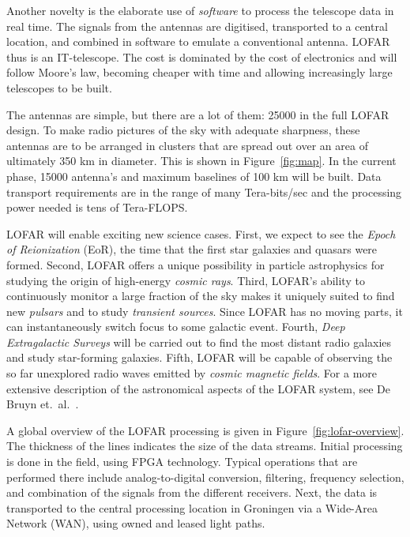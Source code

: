 \documentclass{article}
\begin{document}
Another novelty is the elaborate
use of \emph{software\/} to process the telescope data in real time.
The signals from the
antennas are digitised, transported to a central location,
and combined in software to emulate a conventional antenna. 
LOFAR thus is an IT-telescope. 
The cost
is dominated by the cost of electronics and will follow Moore's law,
becoming cheaper with time and allowing increasingly large telescopes
to be built. 

The antennas are simple, but there are a lot of them: 25000 in the full LOFAR
design. To make radio pictures of the sky with adequate sharpness,
these antennas are to be arranged in clusters that are spread out over
an area of ultimately 350 km in diameter. This is shown in Figure~\ref{fig:map}.
In the current phase, 15000 
antenna's and maximum baselines of 100 km will
be built. Data transport requirements are in the range of many
Tera-bits/sec and the processing power needed is tens of Tera-FLOPS.

LOFAR will enable exciting new science cases.  First, we expect to see
the \emph{Epoch of Reionization\/} (EoR), the time that the first star
galaxies and quasars were formed. Second, LOFAR offers a unique
possibility in particle astrophysics for studying the origin of
high-energy \emph{cosmic rays}.  Third, LOFAR's ability to
continuously monitor a large fraction of the sky makes it uniquely
suited to find new \emph{pulsars} and to study \emph{transient
  sources}.  Since LOFAR has no moving parts, it can instantaneously
switch focus to some galactic event.  Fourth, \emph{Deep Extragalactic
  Surveys\/} will be carried out to find the most distant radio
galaxies and study star-forming galaxies.  Fifth, LOFAR will be
capable of observing the so far unexplored radio waves emitted by
\emph{cosmic magnetic fields}.  For a more extensive description of
the astronomical aspects of the LOFAR system, see De Bruyn
et.~al.~\cite{Bruyn:02}.

A global overview of the LOFAR processing is given in
Figure~\ref{fig:lofar-overview}. The thickness of the lines indicates
the size of the data streams.  Initial processing is done in the
field, using FPGA technology.  Typical operations that are performed
there include analog-to-digital conversion, filtering, frequency
selection, and combination of the signals from the different
receivers.  Next, the data is transported to the central processing
location in Groningen via a Wide-Area Network (WAN), using owned and
leased light paths.
\end{document}
